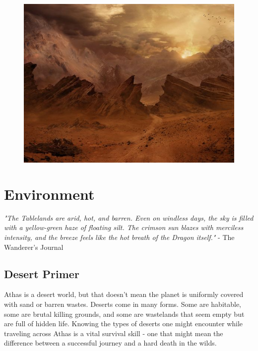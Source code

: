\begin{figure}[H]
\centering
\includegraphics[width=0.7\linewidth]{images/landscape.jpg}
\end{figure}

\section{Environment}\label{chap:environment}

\textit{"The Tablelands are arid, hot, and barren. Even on windless days,
the sky is filled with a yellow-green haze of floating silt. The crimson sun
blazes with merciless intensity, and the breeze feels like the hot breath of
the Dragon itself."} - The Wanderer’s Journal\\

\subsection{Desert Primer}
Athas is a desert world, but that doesn’t mean the planet is uniformly covered
with sand or barren wastes. Deserts come in many forms. Some are habitable,
some are brutal killing grounds, and some are wastelands that seem empty but
are full of hidden life. Knowing the types of deserts one might encounter
while traveling across Athas is a vital survival skill - one that might mean
the difference between a successful journey and a hard death in the wilds.

